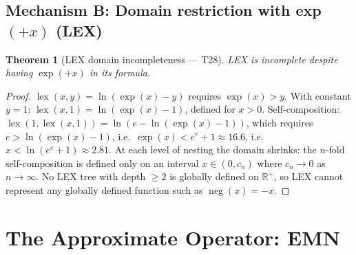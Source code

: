 \documentclass[12pt,a4paper]{article}
\newtheorem{theorem}{Theorem}[section]
\theoremstyle{definition}
\begin{document}
\subsection{Mechanism B: Domain restriction with exp$(+x)$ (LEX)}

\begin{theorem}[LEX domain incompleteness — T28]\label{thm:lex}
LEX is incomplete despite having $\exp(+x)$ in its formula.
\end{theorem}
\begin{proof}
$\operatorname{lex}(x,y)=\ln(\exp(x)-y)$ requires $\exp(x)>y$.
With constant $y=1$: $\operatorname{lex}(x,1)=\ln(\exp(x)-1)$, defined for $x>0$.
Self-composition: $\operatorname{lex}(1,\operatorname{lex}(x,1))=\ln(e-\ln(\exp(x)-1))$,
which requires $e>\ln(\exp(x)-1)$, i.e.\ $\exp(x)<e^e+1\approx 16.6$,
i.e.\ $x<\ln(e^e+1)\approx 2.81$.
At each level of nesting the domain shrinks: the $n$-fold self-composition
is defined only on an interval $x\in(0,c_n)$ where $c_n\to 0$ as $n\to\infty$.
No LEX tree with depth $\geq 2$ is globally defined on $\mathbb{R}^+$, so
LEX cannot represent any globally defined function such as $\operatorname{neg}(x)=-x$.
\end{proof}

\section{The Approximate Operator: EMN}
\end{document}

